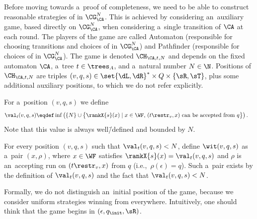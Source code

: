 Before moving towards a~proof of completeness, we need to be able to construct reasonable strategies of \eve in $\CG^N_\CA$.
This is achieved by considering an~auxiliary game, based directly on $\CG^N_\CA$, when considering a~single transition of $\CA$ at each round.
The players of the game are called Automaton (responsible for choosing transitions and choices of \adam in $\CG^N_\CA$) and Pathfinder (responsible for choices of \eve in $\CG^N_\CA$).
The game is denoted $\CH_{\CA,t,N}$ and depends on the fixed automaton $\CA$, a~tree $t\in\trees_A$, and a~natural number $N\in\N$.
Positions of $\CH_{\CA,t,N}$ are triples $(v,q,s)\in\set{\dL,\dR}^\ast\times Q\times\{\sR,\sT\}$,
plus some additional auxiliary positions, to which we do not refer explicitly.

For a~position $(v,q,s)$ we define
\begin{align*}
\val_t(v,q,s)&\eqdef\inf \left(\{N\}\cup\big\{\rankX{s}(x)\mid \text{$x\in\WF$, $(t\restr_v, x)$ can be accepted from $q$}\big\}\right).
\end{align*}
Note that this value is always well\=/defined and bounded by $N$.

For every position $(v,q,s)$ such that $\val_t(v,q,s)<N$, define $\wit(v,q,s)$ as a~pair $(x,\rho)$, where $x\in \WF$ satisfies $\rankX{s}(x) = \val_t(v,q,s)$ and $\rho$ is an~accepting run on $(t\restr_v, x)$ from $q$ (i.e.,~$\rho(\epsilon)=q$).
Such a~pair exists by the definition of $\val_t(v,q,s)$ and the fact that $\val_t(v,q,s)<N$.

Formally, we do not distinguish an~initial position of the game, because we consider uniform strategies winning from everywhere.
Intuitively, one should think that the game begins in $(\epsilon, q_\init, \sR)$.

